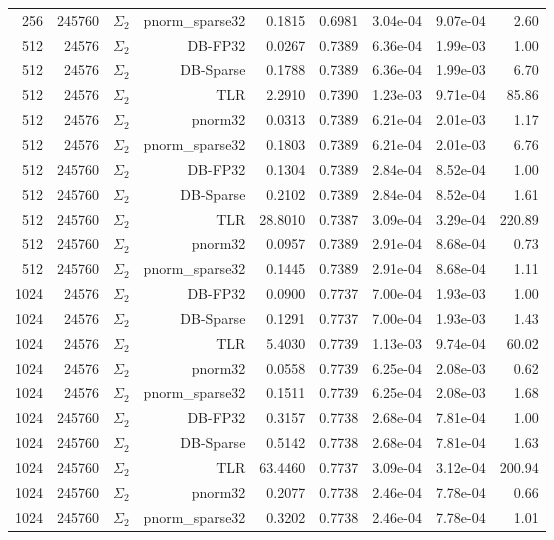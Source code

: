 \begin{tabular}{|r|r|r|r|r|r|r|r|r|}
  256 & 245760 & $\Sigma_2$ & pnorm\_sparse32 & 0.1815 & 0.6981 & 3.04e-04 & 9.07e-04 & 2.60 \\
  512 & 24576 & $\Sigma_2$ & DB-FP32 & 0.0267 & 0.7389 & 6.36e-04 & 1.99e-03 & 1.00 \\
  512 & 24576 & $\Sigma_2$ & DB-Sparse & 0.1788 & 0.7389 & 6.36e-04 & 1.99e-03 & 6.70 \\
  512 & 24576 & $\Sigma_2$ & TLR & 2.2910 & 0.7390 & 1.23e-03 & 9.71e-04 & 85.86 \\
  512 & 24576 & $\Sigma_2$ & pnorm32 & 0.0313 & 0.7389 & 6.21e-04 & 2.01e-03 & 1.17 \\
  512 & 24576 & $\Sigma_2$ & pnorm\_sparse32 & 0.1803 & 0.7389 & 6.21e-04 & 2.01e-03 & 6.76 \\
  512 & 245760 & $\Sigma_2$ & DB-FP32 & 0.1304 & 0.7389 & 2.84e-04 & 8.52e-04 & 1.00 \\
  512 & 245760 & $\Sigma_2$ & DB-Sparse & 0.2102 & 0.7389 & 2.84e-04 & 8.52e-04 & 1.61 \\
  512 & 245760 & $\Sigma_2$ & TLR & 28.8010 & 0.7387 & 3.09e-04 & 3.29e-04 & 220.89 \\
  512 & 245760 & $\Sigma_2$ & pnorm32 & 0.0957 & 0.7389 & 2.91e-04 & 8.68e-04 & 0.73 \\
  512 & 245760 & $\Sigma_2$ & pnorm\_sparse32 & 0.1445 & 0.7389 & 2.91e-04 & 8.68e-04 & 1.11 \\
  1024 & 24576 & $\Sigma_2$ & DB-FP32 & 0.0900 & 0.7737 & 7.00e-04 & 1.93e-03 & 1.00 \\
  1024 & 24576 & $\Sigma_2$ & DB-Sparse & 0.1291 & 0.7737 & 7.00e-04 & 1.93e-03 & 1.43 \\
  1024 & 24576 & $\Sigma_2$ & TLR & 5.4030 & 0.7739 & 1.13e-03 & 9.74e-04 & 60.02 \\
  1024 & 24576 & $\Sigma_2$ & pnorm32 & 0.0558 & 0.7739 & 6.25e-04 & 2.08e-03 & 0.62 \\
  1024 & 24576 & $\Sigma_2$ & pnorm\_sparse32 & 0.1511 & 0.7739 & 6.25e-04 & 2.08e-03 & 1.68 \\
  1024 & 245760 & $\Sigma_2$ & DB-FP32 & 0.3157 & 0.7738 & 2.68e-04 & 7.81e-04 & 1.00 \\
  1024 & 245760 & $\Sigma_2$ & DB-Sparse & 0.5142 & 0.7738 & 2.68e-04 & 7.81e-04 & 1.63 \\
  1024 & 245760 & $\Sigma_2$ & TLR & 63.4460 & 0.7737 & 3.09e-04 & 3.12e-04 & 200.94 \\
  1024 & 245760 & $\Sigma_2$ & pnorm32 & 0.2077 & 0.7738 & 2.46e-04 & 7.78e-04 & 0.66 \\
  1024 & 245760 & $\Sigma_2$ & pnorm\_sparse32 & 0.3202 & 0.7738 & 2.46e-04 & 7.78e-04 & 1.01 \\

\end{tabular}
